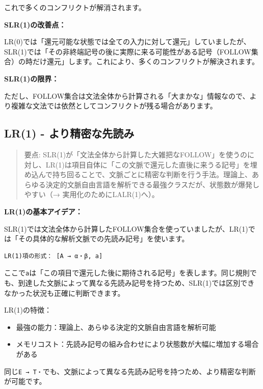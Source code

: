 これで多くのコンフリクトが解消されます。

\textbf{SLR(1)の改善点：}

LR(0)では「還元可能な状態では全ての入力に対して還元」していましたが、SLR(1)では「その非終端記号の後に実際に来る可能性がある記号（FOLLOW集合）の時だけ還元」します。これにより、多くのコンフリクトが解決されます。

\textbf{SLR(1)の限界：}

ただし、FOLLOW集合は文法全体から計算される「大まかな」情報なので、より複雑な文法では依然としてコンフリクトが残る場合があります。

\hypertarget{chapter5-lr1---ux3088ux308aux7cbeux5bc6ux306aux5148ux8aadux307f}{%
\subsection{LR(1) -
より精密な先読み}\label{chapter5-lr1---ux3088ux308aux7cbeux5bc6ux306aux5148ux8aadux307f}}

\begin{quote}
要点:
SLR(1)が「文法全体から計算した大雑把なFOLLOW」を使うのに対し、LR(1)は項目自体に「この文脈で還元した直後に来うる記号」を埋め込んで持ち回ることで、文脈ごとに精密な判断を行う手法。理論上、あらゆる決定的文脈自由言語を解析できる最強クラスだが、状態数が爆発しやすい（→
実用化のためにLALR(1)へ）。
\end{quote}

\textbf{LR(1)の基本アイデア：}

SLR(1)では文法全体から計算したFOLLOW集合を使っていましたが、LR(1)では「その具体的な解析文脈での先読み記号」を使います。

\begin{verbatim}
LR(1)項の形式： [A → α・β, a]
\end{verbatim}

ここで\texttt{a}は「この項目で還元した後に期待される記号」を表します。同じ規則でも、到達した文脈によって異なる先読み記号を持つため、SLR(1)では区別できなかった状況も正確に判断できます。

LR(1)の特徴：

\begin{itemize}
\tightlist
\item
  最強の能力：理論上、あらゆる決定的文脈自由言語を解析可能
\item
  メモリコスト：先読み記号の組み合わせにより状態数が大幅に増加する場合がある
\end{itemize}

同じ\texttt{E\ →\ T・}でも、文脈によって異なる先読み記号を持つため、より精密な判断が可能です。

